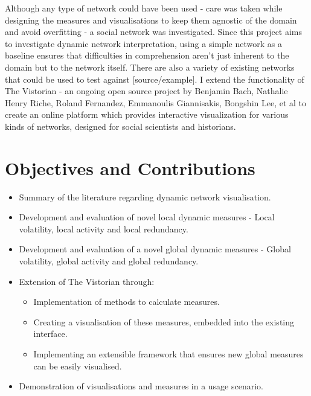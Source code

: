 Although any type of network could have been used - care was taken while designing the measures and visualisations to keep them agnostic of the domain and avoid overfitting - a social network was investigated. 
Since this project aims to investigate dynamic network interpretation, using a simple network as a baseline ensures that difficulties in comprehension aren’t just inherent to the domain but to the network itself. There are also a variety of existing networks that could be used to test against [source/example].
I extend the functionality of The Vistorian \cite{bach:hal-01205822} - an ongoing open source project by Benjamin Bach, Nathalie Henry Riche, Roland Fernandez, Emmanoulis Giannisakis, Bongshin Lee, et al to create an online platform which provides interactive visualization for various kinds of networks, designed for social scientists and historians. 



\section{Objectives and Contributions}
\label{objectives}
\begin{itemize}
    \item Summary of the literature regarding dynamic network visualisation.
    \item Development and evaluation of novel local dynamic measures - Local volatility, local activity and local redundancy.
    \item Development and evaluation of a novel global dynamic measures - Global volatility, global activity and global redundancy.
    \item Extension of The Vistorian through:
    \begin{itemize}
        \item Implementation of methods to calculate measures.
        \item Creating a visualisation of these measures, embedded into the existing interface.
        \item Implementing an extensible framework that ensures new global measures can be easily visualised.
    \end{itemize}
    \item Demonstration of visualisations and measures in a usage scenario.


\end{itemize}





